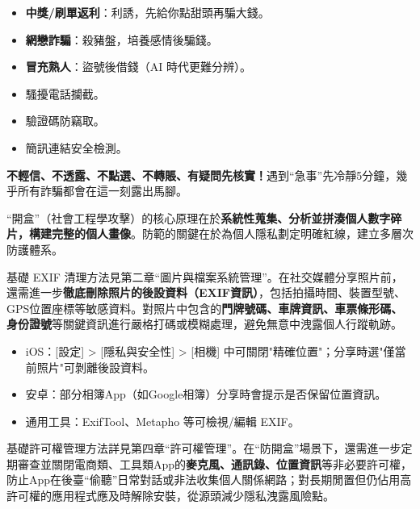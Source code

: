 
\begin{itemize}
  \item \textbf{中獎/刷單返利}：利誘，先給你點甜頭再騙大錢。
  \item \textbf{網戀詐騙}：殺豬盤，培養感情後騙錢。
  \item \textbf{冒充熟人}：盜號後借錢（AI 時代更難分辨）。
\end{itemize}


\begin{itemize}
  \item 騷擾電話攔截。
  \item 驗證碼防竊取。
  \item 簡訊連結安全檢測。
\end{itemize}


\textbf{不輕信、不透露、不點選、不轉賬、有疑問先核實！}遇到“急事”先冷靜5分鐘，幾乎所有詐騙都會在這一刻露出馬腳。


“開盒”（社會工程學攻擊）的核心原理在於\textbf{系統性蒐集、分析並拼湊個人數字碎片，構建完整的個人畫像}。防範的關鍵在於為個人隱私劃定明確紅線，建立多層次防護體系。


基礎 EXIF 清理方法見第二章“圖片與檔案系統管理”。在社交媒體分享照片前，還需進一步\textbf{徹底刪除照片的後設資料（EXIF資訊）}，包括拍攝時間、裝置型號、GPS位置座標等敏感資料。對照片中包含的\textbf{門牌號碼、車牌資訊、車票條形碼、身份證號}等關鍵資訊進行嚴格打碼或模糊處理，避免無意中洩露個人行蹤軌跡。

\begin{itemize}
  \item iOS：[設定] > [隱私與安全性] > [相機] 中可關閉"精確位置"；分享時選"僅當前照片"可剝離後設資料。
  \item 安卓：部分相簿App（如Google相簿）分享時會提示是否保留位置資訊。
  \item 通用工具：ExifTool、Metapho 等可檢視/編輯 EXIF。
\end{itemize}


基礎許可權管理方法詳見第四章“許可權管理”。在“防開盒”場景下，還需進一步定期審查並關閉電商類、工具類App的\textbf{麥克風、通訊錄、位置資訊}等非必要許可權，防止App在後臺“偷聽”日常對話或非法收集個人關係網路；對長期閒置但仍佔用高許可權的應用程式應及時解除安裝，從源頭減少隱私洩露風險點。

